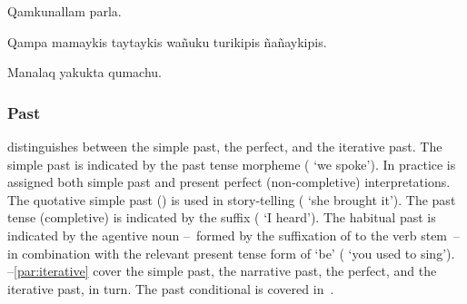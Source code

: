 %
{Qamkunallam parla.}%
{}%
{}{}%

%
{Qampa mamaykis taytaykis wañuku turikipis ñañaykipis.}%
{}%
{}{}%

%
{Manalaq yakukta qumachu.}%
{}%
{}{}%

\subsubsection{Past}\label{ssec:past}
\SYQ{} distinguishes between the simple past, the perfect, and the iterative past. The simple past is indicated by the past tense morpheme  ( ‘we spoke’). In practice  is assigned both simple past and present perfect (non-completive) interpretations. The quotative simple past () is used in story-telling ( ‘she brought it’). The past tense (completive) is indicated by the suffix  ( ‘I heard’). The habitual past is indicated by the agentive noun --~formed by the suffixation of  to the verb stem~-- in combination with the relevant present tense form of  ‘be’ (  ‘you used to sing’). --\ref{par:iterative} cover the simple past, the narrative past, the perfect, and the iterative past, in turn. The past conditional is covered in~.

